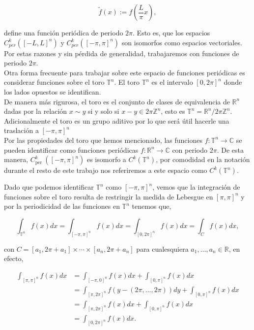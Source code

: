 \documentclass[12pt]{article}
\newcommand\R{\ensuremath{\mathbb{R}}}
\newcommand\T{\mathbb{T}}
\begin{document}
$$
\widetilde{f}(x):=f\left(\frac{L}{\pi} x\right),
$$

define una función periódica de periodo $2 \pi$. Esto es, que los espacios $C_{p e r}^k([-L, L]^n)$ y $C_{p e r}^k([-\pi, \pi]^n)$ son isomorfos como espacios vectoriales. Por estas razones y sin pérdida de generalidad, trabajaremos con funciones de periodo $2\pi$.\\

Otra forma frecuente para trabajar sobre este espacio de funciones periódicas es considerar funciones sobre  el toro $\mathbb{T}^n$. El toro $\mathbb{T}^n$ es el intervalo $[0,2 \pi]^n$ donde los lados opuestos se identifican.\\

De manera más rigurosa, el toro es el conjunto de clases de equivalencia de $\mathbb{R}^n$ dadas por la relación $x \sim y$ si y solo si $x-y \in 2 \pi \mathbb{Z}^n$, esto es $\mathbb{T}^n=\mathbb{R}^n/ 2 \pi \mathbb{Z}^n$. Adicionalmente el toro es un grupo aditivo por lo que será útil hacerle una traslación a $[-\pi,\pi]^n$\\

Por las propiedades del toro que hemos mencionado, las funciones $f: \mathbb{T}^n \rightarrow \mathbb{C}$ se pueden identificar como funciones periódicas $f: \mathbb{R}^n \rightarrow \mathbb{C}$ con periodo $2 \pi$. De esta manera, $C_{\text {per }}^k([-\pi, \pi]^n)$ es isomorfo a $C^k(\mathbb{T}^n)$, por comodidad en la notación durante el resto de  este trabajo nos referiremos a este espacio como $C^k(\T^n)$. \cite{ogrianoc}\\

\begin{note}
    Dado que  podemos identificar $\mathbb{T}^n$ como $[-\pi,\pi]^n$, vemos que la integración de funciones sobre el toro resulta de restringir la medida de Lebesgue en $[\pi,\pi]^n$ y por la periodicidad de las funciones en $\mathbb{T}^n$ tenemos que,

    $$\int_{\mathbb{T}^n} f(x) d x=\int_{[-\pi,\pi]^n} f(x) d x=\int_{[0,2\pi]^n} f(x) d x=\int_{C} f(x) d x,$$


    con $C=\left[a_1, 2\pi+a_1\right] \times \cdots \times\left[a_n, 2\pi+a_n\right]$ para cualesquiera $a_1,\ldots,a_n \in \R$, en efecto,

    $$\begin{aligned}
    \int_{[\pi, \pi]^n} f(x) d x & =\int_{[-\pi, 0]^n} f(x) d x+\int_{[0, \pi]^n} f(x) d x \\
     & =\int_{[\pi, 2 \pi]^n} f(y-(2 \pi,\ldots,2\pi)) d y+\int_{[0, \pi]^n} f(x) d x \\
    & =\int_{[\pi, 2 \pi]^n} f(x) d x+\int_{[0, \pi]^n} f(x) d x\\
    &=\int_{[0,2\pi]^n} f(x) d x.
    \end{aligned}$$
\end{note}
\end{document}
